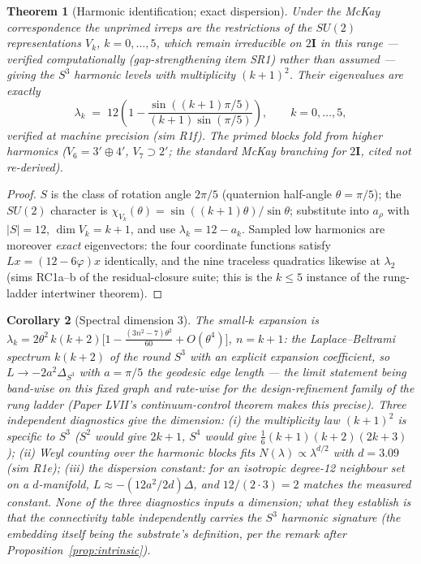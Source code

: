\documentclass[12pt]{article}
\newtheorem{theorem}{Theorem}
\newtheorem{corollary}[theorem]{Corollary}
\theoremstyle{definition}
\theoremstyle{remark}
\newcommand{\twoI}{2\mathbf{I}}
\begin{document}
\begin{theorem}[Harmonic identification; exact dispersion]\label{thm:dispersion}
Under the McKay correspondence the unprimed irreps are the restrictions of the $SU(2)$ representations $V_k$, $k = 0,\ldots,5$, which remain irreducible on $\twoI$ in this range --- verified computationally (gap-strengthening item SR1) rather than assumed --- giving the $S^3$ harmonic levels with multiplicity $(k+1)^2$. Their eigenvalues are exactly
$$\lambda_k \;=\; 12\left(1 - \frac{\sin((k+1)\pi/5)}{(k+1)\sin(\pi/5)}\right), \qquad k = 0,\dots,5,$$
verified at machine precision (sim R1f). The primed blocks fold from higher harmonics ($V_6 = 3'\oplus 4'$, $V_7 \supset 2'$; the standard McKay branching for $\twoI$, cited not re-derived).
\end{theorem}

\begin{proof}
$S$ is the class of rotation angle $2\pi/5$ (quaternion half-angle $\theta = \pi/5$); the $SU(2)$ character is $\chi_{V_k}(\theta) = \sin((k{+}1)\theta)/\sin\theta$; substitute into $a_\rho$ with $|S| = 12$, $\dim V_k = k+1$, and use $\lambda_k = 12 - a_k$. Sampled low harmonics are moreover \emph{exact} eigenvectors: the four coordinate functions satisfy $L x = (12 - 6\varphi)x$ identically, and the nine traceless quadratics likewise at $\lambda_2$ (sims RC1a--b of the residual-closure suite; this is the $k\le5$ instance of the rung-ladder intertwiner theorem).
\end{proof}

\begin{corollary}[Spectral dimension 3]\label{cor:dim3}
The small-$k$ expansion is $\lambda_k = 2\theta^2\,k(k+2)\bigl[1 - \tfrac{(3n^2-7)\theta^2}{60} + O(\theta^4)\bigr]$, $n = k{+}1$: the Laplace--Beltrami spectrum $k(k+2)$ of the \emph{round $S^3$} with an explicit expansion coefficient, so $L \to -2a^2\Delta_{S^3}$ with $a = \pi/5$ the geodesic edge length --- the limit statement being band-wise on this fixed graph and rate-wise for the design-refinement family of the rung ladder (Paper LVII's continuum-control theorem makes this precise). Three independent diagnostics give the dimension: (i) the multiplicity law $(k+1)^2$ is specific to $S^3$ ($S^2$ would give $2k+1$, $S^4$ would give $\tfrac16(k{+}1)(k{+}2)(2k{+}3)$); (ii) Weyl counting over the harmonic blocks fits $N(\lambda)\propto\lambda^{d/2}$ with $d = 3.09$ (sim R1e); (iii) the dispersion constant: for an isotropic degree-12 neighbour set on a $d$-manifold, $L \approx -(12a^2/2d)\Delta$, and $12/(2\cdot3) = 2$ matches the measured constant. None of the three diagnostics inputs a dimension; what they establish is that the connectivity table independently carries the $S^3$ harmonic signature (the embedding itself being the substrate's definition, per the remark after Proposition~\ref{prop:intrinsic}).
\end{corollary}
\end{document}
